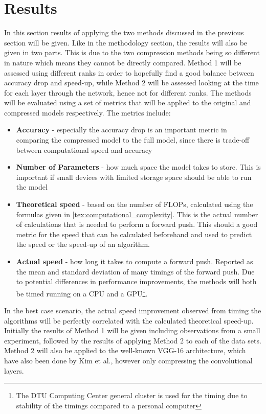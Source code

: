 \section{Results} \label{tex:results}
In this section results of applying the two methods discussed in the previous section will be given. Like in the methodology section, the results will also be given in two parts. This is due to the two compression methods being so different in nature which means they cannot be directly compared. Method 1 will be assessed using different ranks in order to hopefully find a good balance between accuracy drop and speed-up, while Method 2 will be assessed looking at the time for each layer through the network, hence not for different ranks. The methods will be evaluated using a set of metrics that will be applied to the original and compressed models respectively. The metrics include:
\begin{itemize}
    \item \textbf{Accuracy} - especially the accuracy drop is an important metric in comparing the compressed model to the full model, since there is trade-off between computational speed and accuracy
    \item \textbf{Number of Parameters} - how much space the model takes to store. This is important if small devices with limited storage space should be able to run the model
    \item \textbf{Theoretical speed} - based on the number of FLOPs, calculated using the formulas given in \autoref{tex:computational_complexity}. This is the actual number of calculations that is needed to perform a forward push. This should a good metric for the speed that can be calculated beforehand and used to predict the speed or the speed-up of an algorithm.
    \item \textbf{Actual speed} - how long it takes to compute a forward push. Reported as the mean and standard deviation of many timings of the forward push. Due to potential differences in performance improvements, the methods will both be timed running on a CPU and a GPU\footnote{The DTU Computing Center general cluster\cite{HPC} is used for the timing due to stability of the timings compared to a personal computer}.
\end{itemize}
In the best case scenario, the actual speed improvement observed from timing the algorithms will be perfectly correlated with the calculated theoretical speed-up. Initially the results of Method 1 will be given including observations from a small experiment, followed by the results of applying Method 2 to each of the data sets. Method 2 will also be applied to the well-known VGG-16 architecture\cite{Simonyan2015}, which have also been done by Kim et al.\cite{Kim2016}, however only compressing the convolutional layers.

